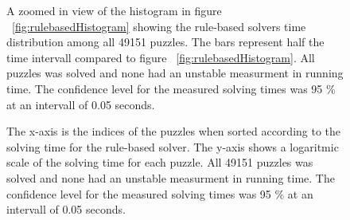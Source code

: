 \documentclass[a4paper,11pt]{kth-mag}
\begin{document}
\begin{figure}[here] 
\noindent{}
\caption{A zoomed in view of the histogram in figure ~\ref{fig:rulebasedHistogram} showing the rule-based solvers time distribution among all 49151 puzzles. The bars represent half the time intervall compared to figure ~\ref{fig:rulebasedHistogram}. All puzzles was solved and none had an unstable measurment in running time. The confidence level for the measured solving times was 95 \% at an intervall of 0.05 seconds.}
\label{fig:rulebasedHistogram2}
\end{figure}

\begin{figure}[here] 
\noindent{}
\caption{The x-axis is the indices of the puzzles when sorted according to the solving time for the rule-based solver. The y-axis shows a logaritmic scale of the solving time for each puzzle. All 49151 puzzles was solved and none had an unstable measurment in running time. The confidence level for the measured solving times was 95 \% at an intervall of 0.05 seconds.}
\label{fig:rulebasedIndices}
\end{figure}
\end{document}
